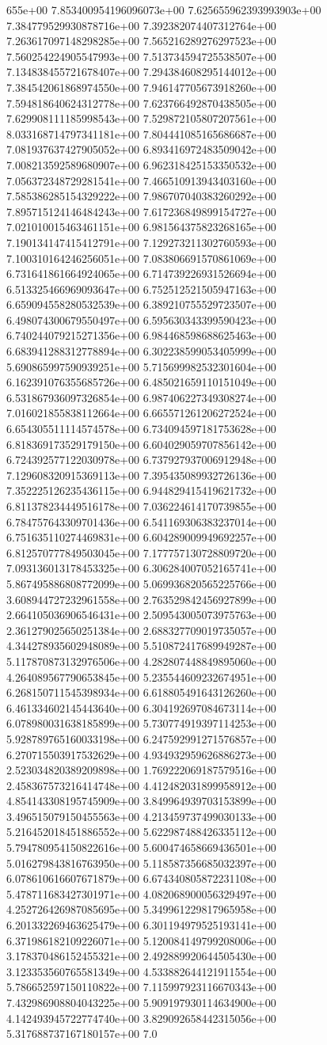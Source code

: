 655e+00	7.853400954196096073e+00	7.625655962393993903e+00	7.384779529930878716e+00	7.392382074407312764e+00	7.263617097148298285e+00	7.565216289276297523e+00	7.560254224905547993e+00	7.513734594725538507e+00	7.134838455721678407e+00	7.294384608295144012e+00	7.384542061868974550e+00	7.946147705673918260e+00	7.594818640624312778e+00	7.623766492870438505e+00	7.629908111185998543e+00	7.529872105807207561e+00	8.033168714797341181e+00	7.804441085165686687e+00	7.081937637427905052e+00	6.893416972483509042e+00	7.008213592589680907e+00	6.962318425153350532e+00	7.056372348729281541e+00	7.466510913943403160e+00	7.585386285154329222e+00	7.986707040383260292e+00	7.895715124146484243e+00	7.617236849899154727e+00	7.021010015463461151e+00	6.981564375823268165e+00	7.190134147415412791e+00	7.129273211302760593e+00	7.100310164246256051e+00	7.083806691570861069e+00	6.731641861664924065e+00	6.714739226931526694e+00	6.513325466969093647e+00	6.752512521505947163e+00	6.659094558280532539e+00	6.389210755529723507e+00	6.498074300679550497e+00	6.595630343399590423e+00	6.740244079215271356e+00	6.984468598688625463e+00	6.683941288312778894e+00	6.302238599053405999e+00	5.690865997590939251e+00	5.715699982532301604e+00	6.162391076355685726e+00	6.485021659110151049e+00	6.531867936097326854e+00	6.987406227349308274e+00	7.016021855838112664e+00	6.665571261206272524e+00	6.654305511114574578e+00	6.734094597181753628e+00	6.818369173529179150e+00	6.604029059707856142e+00	6.724392577122030978e+00	6.737927937006912948e+00	7.129608320915369113e+00	7.395435089932726136e+00	7.352225126235436115e+00	6.944829415419621732e+00	6.811378234449516178e+00	7.036224614170739855e+00	6.784757643309701436e+00	6.541169306383237014e+00	6.751635110274469831e+00	6.604289009949692257e+00	6.812570777849503045e+00	7.177757130728809720e+00	7.093136013178453325e+00	6.306284007052165741e+00	5.867495886808772099e+00	5.069936820565225766e+00	3.608944727232961558e+00	2.763529842456927899e+00	2.664105036906546431e+00	2.509543005073975763e+00	2.361279025650251384e+00	2.688327709019735057e+00	4.344278935602948089e+00	5.510872417689949287e+00	5.117870873132976506e+00	4.282807448849895060e+00	4.264089567790653845e+00	5.235544609232674951e+00	6.268150711545398934e+00	6.618805491643126260e+00	6.461334602145443640e+00	6.304192697084673114e+00	6.078980031638185899e+00	5.730774919397114253e+00	5.928789765160033198e+00	6.247592991271576857e+00	6.270715503917532629e+00	4.934932959626886273e+00	2.523034820389209898e+00	1.769222069187579516e+00	2.458367573216414748e+00	4.412482031899958912e+00	4.854143308195745909e+00	3.849964939703153899e+00	3.496515079150455563e+00	4.213459737499030133e+00	5.216452018451886552e+00	5.622987488426335112e+00	5.794780954150822616e+00	5.600474658669436501e+00	5.016279843816763950e+00	5.118587356685032397e+00	6.078610616607671879e+00	6.674340805872231108e+00	5.478711683427301971e+00	4.082068900056329497e+00	4.252726426987085695e+00	5.349961229817965958e+00	6.201332269463625479e+00	6.301194979525193141e+00	6.371986182109226071e+00	5.120084149799208006e+00	3.178370486152455321e+00	2.492889920644505430e+00	3.123353560765581349e+00	4.533882644121911554e+00	5.786652597150110822e+00	7.115997923116670343e+00	7.432986908804043225e+00	5.909197930114634900e+00	4.142493945722774740e+00	3.829092658442315056e+00	5.317688737167180157e+00	7.0